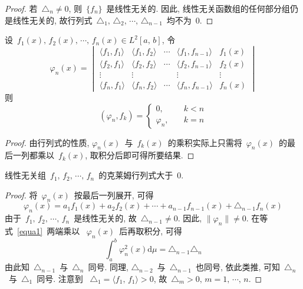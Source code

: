 \begin{proof}
若~$\triangle_{n}\neq 0$, 则~$\{f_{n}\}$~是线性无关的. 因此, 线性无关函数组的任何部分组仍是线性无关的, 故行列式~$\triangle_{1},\, \triangle_{2},\, \cdots,\, \triangle_{n-1}$~均不为~0.
\end{proof}

\begin{Lemma}
设~$f_{1}(x),\, f_{2}(x),\, \cdots,\,  f_{n}(x)\in L^2[a,\,b]$, 令
\[
\varphi_{n}(x)=\begin{vmatrix}
\langle f_{1},f_{1}\rangle & \langle f_{1},f_{2}\rangle & \cdots & \langle f_{1},f_{n-1}\rangle &f_{1}(x)\\[0.1cm]
\langle f_{2},f_{1}\rangle &\langle f_{2},f_{2}\rangle & \cdots & \langle f_{2},f_{n-1}\rangle & f_{2}(x)\\[0.1cm]
\vdots&\vdots&                     &\vdots &\vdots\\[0.1cm]
\langle f_{n},f_{1}\rangle & \langle f_{n},f_{2}\rangle & \cdots & \langle f_{n},f_{n-1}\rangle & f_{n}(x)
\end{vmatrix}
\]
则
\[
(\varphi_{n},f_{k})= \left\{\!\!
\begin{array}{cl}
0, & \quad k<n \\[0.1cm]
\varphi_{n}, & \quad k=n
\end{array}
\right.
\]
\end{Lemma}

\begin{proof}
由行列式的性质, $\varphi_{n}(x)$~与~$f_{k}(x)$~的乘积实际上只需将~$\varphi_{n}(x)$~的最后一列都乘以~$f_{k}(x)$, 取积分后即可得所要结果.
\end{proof}

\begin{Theorem}
线性无关组~$f_{1},\, f_{2},\, \cdots,\,  f_{n}$~的克莱姆行列式大于~0.
\end{Theorem}

\begin{proof}
将~$\varphi_{n}(x)$~按最后一列展开, 可得
\begin{equation}\label{equa1}
\varphi_{n}(x)=a_{1}f_{1}(x)+a_{2}f_{2}(x)+\cdots+a_{n-1}f_{n-1}(x)+\triangle_{n-1}f_{n}(x)
\end{equation}
由于~$f_{1},\, f_{2},\, \cdots,\,  f_{n}$~是线性无关的, 故~$\triangle_{n-1}\neq 0$. 因此, $\|\varphi_{n}\|\neq 0$. 在等式~\eqref{equa1}~两端乘以
~$\varphi_{n}(x)$~后再取积分, 可得
\[
\int_{a}^{b}\varphi_{n}^{2}(x)\mathrm{d}\mu=\triangle_{n-1}\triangle_{n}
\]
由此知~$\triangle_{n-1}$~与~$\triangle_{n}$~同号. 同理, $\triangle_{n-2}$~与~$\triangle_{n-1}$~也同号, 依此类推, 可知~$\triangle_{n}$~与~$\triangle_{1}$~同号. 注意到
~$\triangle_{1}=\langle f_{1},\,f_{1}\rangle>0$, 故~$\triangle_{m}>0,\, m=1,\,\cdots,\,n$.
\end{proof}

